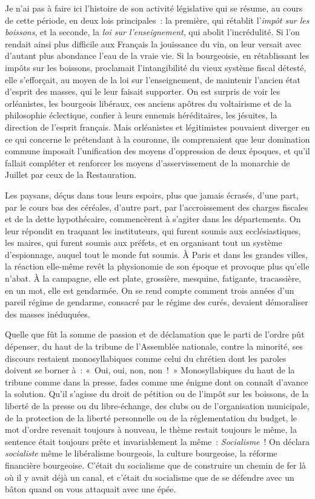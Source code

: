 \documentclass[french,twoside]{book} %
\begin{document}
Je n’ai pas à faire ici l’histoire de son activité législative qui se résume, au cours de cette période, en deux lois principales : la première, qui rétablit l’\emph{impôt sur les boissons}, et la seconde, la \emph{loi sur l’enseignement}, qui abolit l’incrédulité. Si l’on rendait ainsi plus difficile aux Français la jouissance du vin, on leur versait avec d’autant plus abondance l’eau de la vraie vie. Si la bourgeoisie, en rétablissant les impôts sur les boissons, proclamait l’intangibilité du vieux système fiscal détesté, elle s’efforçait, au moyen de la loi sur l’enseignement, de maintenir l’ancien état d’esprit des masses, qui le leur faisait supporter. On est surpris de voir les orléanistes, les bourgeois libéraux, ces anciens apôtres du voltairisme et de la philosophie éclectique, confier à leurs ennemis héréditaires, les jésuites, la direction de l’esprit français. Mais orléanistes et légitimistes pouvaient diverger en ce qui concerne le prétendant à la couronne, ils comprenaient que leur domination commune imposait l’unification des moyens d’oppression de deux époques, et qu’il fallait compléter et renforcer les moyens d’asservissement de la monarchie de Juillet par ceux de la Restauration.\par
Les paysans, déçus dans tous leurs espoirs, plus que jamais écrasés, d’une part, par le cours bas des céréales, d’autre part, par l’accroissement des charges fiscales et de la dette hypothécaire, commencèrent à s’agiter dans les départements. On leur répondit en traquant les instituteurs, qui furent soumis aux ecclésiastiques, les maires, qui furent soumis aux préfets, et en organisant tout un système d’espionnage, auquel tout le monde fut soumis. À Paris et dans les grandes villes, la réaction elle-même revêt la physionomie de son époque et provoque plus qu’elle n’abat. À la campagne, elle est plate, grossière, mesquine, fatigante, tracassière, en un mot, elle est gendarmée. On se rend compte comment trois années d’un pareil régime de gendarme, consacré par le régime des curés, devaient démoraliser des masses inéduquées.\par
Quelle que fût la somme de passion et de déclamation que le parti de l’ordre pût dépenser, du haut de la tribune de l’Assemblée nationale, contre la minorité, ses discours restaient monosyllabiques comme celui du chrétien dont les paroles doivent se borner à : « Oui, oui, non, non ! » Monosyllabiques du haut de la tribune comme dans la presse, fades comme une énigme dont on connaît d’avance la solution. Qu’il s’agisse du droit de pétition ou de l’impôt sur les boissons, de la liberté de la presse ou du libre-échange, des clubs ou de l’organisation municipale, de la protection de la liberté personnelle ou de la réglementation du budget, le mot d’ordre revenait toujours à nouveau, le thème restait toujours le même, la sentence était toujours prête et invariablement la même : \emph{Socialisme} ! On déclara \emph{socialiste} même le libéralisme bourgeois, la culture bourgeoise, la réforme financière bourgeoise. C’était du socialisme que de construire un chemin de fer là où il y avait déjà un canal, et c’était du socialisme que de se défendre avec un bâton quand on vous attaquait avec une épée.\par
\end{document}

